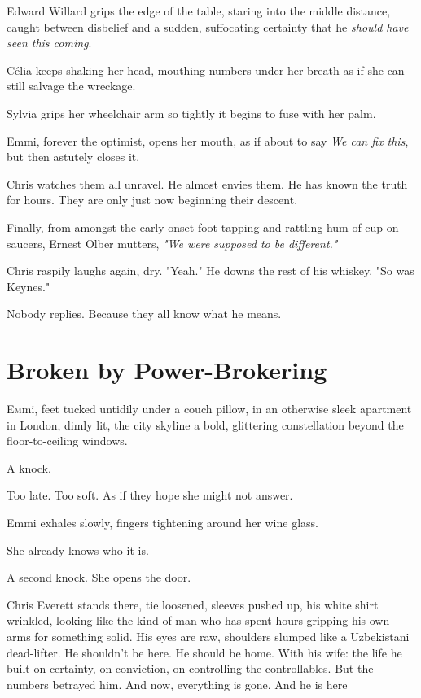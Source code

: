Edward Willard grips the edge of the table, staring into the middle distance, caught between disbelief and a sudden, suffocating certainty that he \textit{should have seen this coming}.

Célia keeps shaking her head, mouthing numbers under her breath as if she can still salvage the wreckage.

Sylvia grips her wheelchair arm so tightly it begins to fuse with her palm.

Emmi, forever the optimist, opens her mouth, as if about to say \textit{We can fix this}, but then astutely closes it.

\smallskip

Chris watches them all unravel. He almost envies them. He has known the truth for hours. They are only just now beginning their descent.

\smallskip

Finally, from amongst the early onset foot tapping and rattling hum of cup on saucers, Ernest Olber mutters, \textit{"We were supposed to be different."}

\smallskip

Chris raspily laughs again, dry. "Yeah." He downs the rest of his whiskey. "So was Keynes."

\smallskip

Nobody replies. Because they all know what he means.

\newpage
\section*{Broken by Power-Brokering}

\lettrine{E}mmi, feet tucked untidily under a couch pillow, in an otherwise sleek apartment in London, dimly lit, the city skyline a bold, glittering constellation beyond the floor-to-ceiling windows.  
\smallskip

A knock. 

\smallskip

Too late. Too soft. As if they hope she might not answer.  

Emmi exhales slowly, fingers tightening around her wine glass. 

She already knows who it is.  

A second knock. She opens the door.  

\smallskip

Chris Everett stands there, tie loosened, sleeves pushed up, his white shirt wrinkled, looking like the kind of man who has spent hours gripping his own arms for something solid. His eyes are raw, shoulders slumped like a Uzbekistani dead-lifter. He shouldn’t be here. He should be home. With his wife: the life he built on certainty, on conviction, on controlling the controllables.  But the numbers betrayed him. And now, everything is gone. And he is here  

